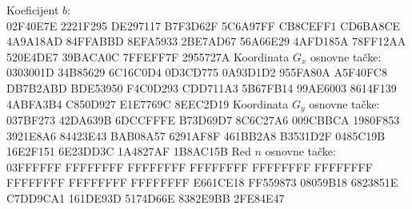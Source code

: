 \noindent Koeficijent $b$:\\[0.5ex]
{\ttfamily\small 02F40E7E 2221F295 DE297117 B7F3D62F 5C6A97FF CB8CEFF1 CD6BA8CE 4A9A18AD 84FFABBD 8EFA5933 2BE7AD67 56A66E29 4AFD185A 78FF12AA 520E4DE7 39BACA0C 7FFEFF7F 2955727A}
\medbreak
\noindent Koordinata $G_x$ osnovne tačke:\\[0.5ex]
{\ttfamily\small 0303001D 34B85629 6C16C0D4 0D3CD775 0A93D1D2 955FA80A A5F40FC8 DB7B2ABD BDE53950 F4C0D293 CDD711A3 5B67FB14 99AE6003 8614F139 4ABFA3B4 C850D927 E1E7769C 8EEC2D19}
\medbreak
\noindent Koordinata $G_y$ osnovne tačke:\\[0.5ex]
{\ttfamily\small 037BF273 42DA639B 6DCCFFFE B73D69D7 8C6C27A6 009CBBCA 1980F853 3921E8A6 84423E43 BAB08A57 6291AF8F 461BB2A8 B3531D2F 0485C19B 16E2F151 6E23DD3C 1A4827AF 1B8AC15B}
\medbreak
\noindent Red $n$ osnovne tačke:\\[0.5ex]
{\ttfamily\small 03FFFFFF FFFFFFFF FFFFFFFF FFFFFFFF FFFFFFFF FFFFFFFF FFFFFFFF FFFFFFFF FFFFFFFF E661CE18 FF559873 08059B18 6823851E C7DD9CA1 161DE93D 5174D66E 8382E9BB 2FE84E47}
